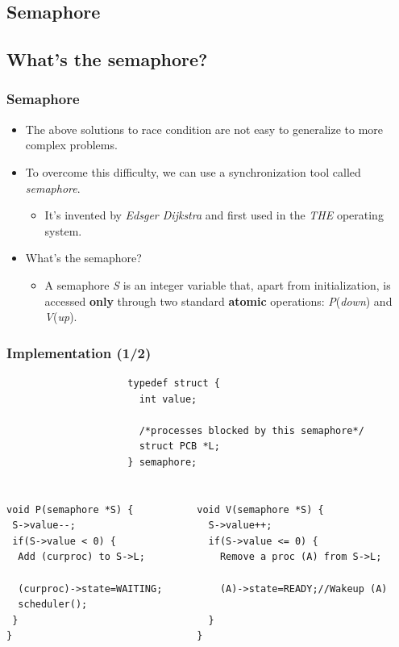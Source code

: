 \documentclass[CJKutf8,xcolor=pdftex,dvipsnames,table]{beamer}
\begin{document}
\begin{CJK*}{UTF8}{song}
\section{Semaphore}

\subsection{What's the semaphore?}

  \begin{frame}
  \frametitle{Semaphore} \pause
  \begin{itemize}
  \item{The above solutions to race condition are not easy to generalize to more complex problems.} \pause
  \item{To overcome this difficulty, we can use a synchronization tool called \emph{semaphore}.} \pause
    \begin{itemize}
    \item{It's invented by \textit{Edsger Dijkstra} and first used in the \emph{THE} operating system.} \pause
    \end{itemize}
  \item{What's the semaphore?} \pause
    \begin{itemize}
    \item{A semaphore \emph{S} is an integer variable that, apart from
      initialization, is accessed \textbf{only} through two standard \textbf{atomic} operations: \emph{P}(\emph{down}) and \emph{V}(\emph{up}).}
    \end{itemize}
  \end{itemize}
  \end{frame}

  \begin{frame}[fragile]
  \frametitle{Implementation (1/2)} \pause

\begin{lstlisting}
                     typedef struct {
                       int value;

                       /*processes blocked by this semaphore*/
                       struct PCB *L;
                     } semaphore;


void P(semaphore *S) {           void V(semaphore *S) {
 S->value--;                       S->value++;
 if(S->value < 0) {                if(S->value <= 0) {
  Add (curproc) to S->L;             Remove a proc (A) from S->L;

  (curproc)->state=WAITING;          (A)->state=READY;//Wakeup (A)
  scheduler();
 }                                 }
}                                }
\end{lstlisting}


\end{frame}
\end{CJK*}
\end{document}
